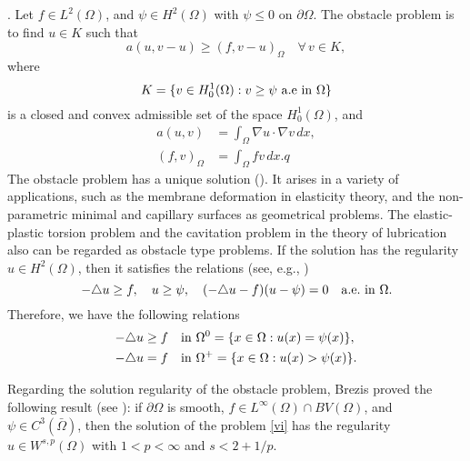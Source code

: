 \documentclass[12pt]{article}
\begin{document}
. Let $f\in L^2(\Omega)$, and $\psi \in H^2(\Omega)$ with $\psi \leq 0$ on $\partial\Omega$.
The obstacle problem is to find $u \in K$ such that
\begin{equation}\label{vi}
a(u,v-u) \geq (f,v-u)_\Omega \quad\forall\, v \in K,
\end{equation}
where
\begin{equation}\label{admi}
K=\{v\in H^1_0(\Omega): v\geq\psi\ {\rm a.e\ in}\ \Omega\}
\end{equation}
is a closed and convex admissible set of the space $H^1_0(\Omega)$, and
\begin{align*}
a(u,v) & =\int_\Omega \nabla u\cdot\nabla v\, dx, \\
(f,v)_\Omega &=\int_\Omega  f v \, dx. q
\end{align*}
The obstacle problem has a unique solution (\cite{duvaut76}).
It arises in a variety of
applications, such as the membrane deformation in elasticity
theory, and the non-parametric minimal and capillary surfaces as
geometrical problems. The elastic-plastic torsion problem and the
cavitation problem in the theory of lubrication also can be
regarded as obstacle type problems. If the solution has the regularity $u
\in H^2(\Omega)$, then it satisfies the relations (see, e.g., \cite{atkinson05})
\begin{equation}\label{pde}
 -\triangle u\geq f ,  \quad u\geq \psi , \quad
(-\triangle u- f)(u- \psi)=0 \quad {\rm a.e.\ in\ }\Omega.
\end{equation}
Therefore, we have the following relations
\begin{align*}
 -\triangle u &\geq f\quad {\rm in}\ \Omega^0 = \{x\in \Omega:u(x) = \psi(x)\},\\
 -\triangle u&=f\quad {\rm in}\ \Omega^+=\{x\in\Omega:u(x)>\psi(x)\}.
\end{align*}

Regarding the solution regularity of the obstacle problem, Brezis proved the
following result (see \cite{kinderlehrer80,rodrigues87}): if $\partial\Omega$ is smooth, 
$f\in L^\infty(\Omega)\cap BV(\Omega)$, and $\psi\in C^3(\bar{\Omega})$, then the 
solution of the problem \eqref{vi} has the regularity $u\in W^{s,p}(\Omega)$ with 
$1<p<\infty$ and $s<2+1/p$. 
\end{document}
